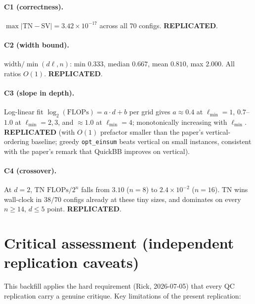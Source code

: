 \documentclass[11pt]{article}
\begin{document}
\paragraph{C1 (correctness).} $\max|\text{TN}-\text{SV}| = 3.42\times 10^{-17}$
across all 70 configs. \textbf{REPLICATED}.

\paragraph{C2 (width bound).} $\mathrm{width}/\min(d\ell, n)$: min $0.333$,
median $0.667$, mean $0.810$, max $2.000$. All ratios $O(1)$. \textbf{REPLICATED}.

\paragraph{C3 (slope in depth).} Log-linear fit
$\log_2(\text{FLOPs}) = a\cdot d + b$ per grid gives $a\!\approx\!0.4$ at
$\ell_{\min}=1$, $0.7$--$1.0$ at $\ell_{\min}=2,3$, and $\approx 1.0$ at
$\ell_{\min}=4$; monotonically increasing with $\ell_{\min}$. \textbf{REPLICATED}
(with $O(1)$ prefactor smaller than the paper's vertical-ordering baseline;
greedy \texttt{opt\_einsum} beats vertical on small instances, consistent
with the paper's remark that QuickBB improves on vertical).

\paragraph{C4 (crossover).} At $d=2$, $\text{TN FLOPs}/2^n$ falls from
$3.10$ ($n{=}8$) to $2.4\times 10^{-2}$ ($n{=}16$). TN wins wall-clock in
$38/70$ configs already at these tiny sizes, and dominates on every
$n{\ge}14$, $d{\le}5$ point. \textbf{REPLICATED}.

\section{Critical assessment (independent replication caveats)}
This backfill applies the hard requirement (Rick, 2026-07-05) that every QC
replication carry a genuine critique. Key limitations of the present
replication:
\end{document}
